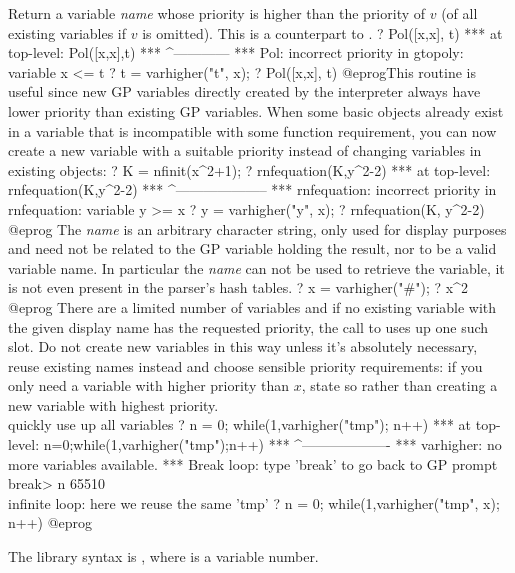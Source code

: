 \label{se:varhigher}
Return a variable \emph{name} whose priority is higher
than the priority of $v$ (of all existing variables if $v$ is omitted).
This is a counterpart to .
\bprog
? Pol([x,x], t)
 ***   at top-level: Pol([x,x],t)
 ***                 ^------------
 *** Pol: incorrect priority in gtopoly: variable x <= t
? t = varhigher("t", x);
? Pol([x,x], t)
@eprog\noindent This routine is useful since new GP variables directly
created by the interpreter always have lower priority than existing
GP variables. When some basic objects already exist in a variable
that is incompatible with some function requirement, you can now
create a new variable with a suitable priority instead of changing variables
in existing objects:
\bprog
? K = nfinit(x^2+1);
? rnfequation(K,y^2-2)
 ***   at top-level: rnfequation(K,y^2-2)
 ***                 ^--------------------
 *** rnfequation: incorrect priority in rnfequation: variable y >= x
? y = varhigher("y", x);
? rnfequation(K, y^2-2)
@eprog\noindent
{}
The \emph{name} is an arbitrary character string, only used for display
purposes and need not be related to the GP variable holding the result, nor
to be a valid variable name. In particular the \emph{name} can
not be used to retrieve the variable, it is not even present in the parser's
hash tables.
\bprog
? x = varhigher("#");
? x^2
@eprog
 There are a limited number of variables and if no
existing variable with the given display name has the requested
priority, the call to  uses up one such slot. Do not create
new variables in this way unless it's absolutely necessary,
reuse existing names instead and choose sensible priority requirements:
if you only need a variable with higher priority than $x$, state so
rather than creating a new variable with highest priority.
\bprog
\\ quickly use up all variables
? n = 0; while(1,varhigher("tmp"); n++)
 ***   at top-level: n=0;while(1,varhigher("tmp");n++)
 ***                             ^-------------------
 *** varhigher: no more variables available.
 ***   Break loop: type 'break' to go back to GP prompt
break> n
65510
\\ infinite loop: here we reuse the same 'tmp'
? n = 0; while(1,varhigher("tmp", x); n++)
@eprog

The library syntax is , where  is a variable number.

